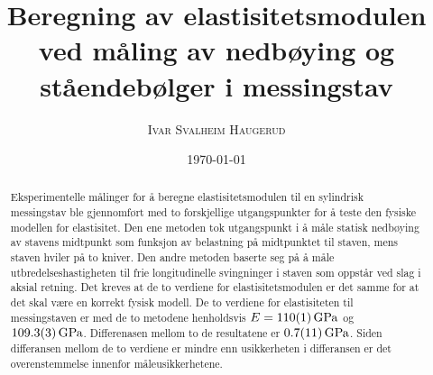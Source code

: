 \documentclass[%
 reprint,
 amsmath,amssymb,
 aps,
 norsk,
 booktabs
]{revtex4-1}
\begin{document}
\title{Beregning av elastisitetsmodulen ved måling av nedbøying og ståendebølger i messingstav}
\author{\textsc{Ivar Svalheim Haugerud}}
\date{\today}

\begin{abstract}
  Eksperimentelle målinger for å beregne elastisitetsmodulen til en sylindrisk messingstav ble gjennomført med to forskjellige utgangspunkter for å teste den fysiske modellen for elastisitet. Den ene metoden tok utgangspunkt i å måle statisk nedbøying av stavens midtpunkt som funksjon av belastning på midtpunktet til staven, mens staven hviler på to kniver. Den andre metoden baserte seg på å måle utbredelseshastigheten til frie longitudinelle svingninger i staven som oppstår ved slag i aksial retning. Det kreves at de to verdiene for elastisitetsmodulen er det samme for at det skal være en korrekt fysisk modell. De to verdiene for elastisiteten til messingstaven er med de to metodene henholdsvis
  $E=\SI{110\pm1}{\giga\pascal}$ og $\SI{109.3\pm0.3}{\giga\pascal}$. Differenasen mellom to de resultatene er $\SI{0.7\pm1.1}{\giga\pascal}$. Siden differansen mellom de to verdiene er mindre enn usikkerheten i differansen er det overenstemmelse innenfor måleusikkerhetene.
\end{abstract}

\maketitle

\end{document}
